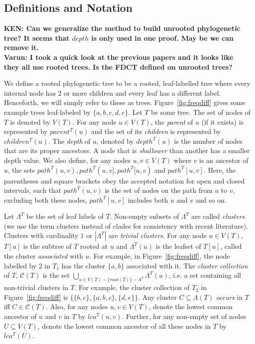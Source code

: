 \documentclass[final,1p,times]{elsarticle}
\newcommand{\leafset}{\Lambda}
\begin{document}
    \subsection{Definitions and Notation}
    \label{subsec:def}

    {\bf KEN: Can we generalize the method to build unrooted phylogenetic tree? It seems that $depth$ is only used in one proof. May be we can remove it.}\\
	{\bf Varun: I took a quick look at the previous papers and it looks like they all use rooted trees. Is the FDCT defined on unrooted trees?}

    We define a rooted phylogenetic tree to be a rooted, leaf-labelled tree where every internal node has 2 or more children and every leaf has a different label.  Henceforth, we will simply refer to these as trees.  Figure~\ref{fig:freqdiff} gives some example trees leaf-labeled by $\{a, b, c, d, e\}$.  Let $T$ be some tree. The set of nodes of $T$ is denoted by $V(T)$. For any node $u \in V(T)$, the \textit{parent} of $u$ (if it exists) is represented by $parent^T(u)$ and the set of its \textit{children} is represented by $children^T(u)$. The \textit{depth} of $u$, denoted by $depth^T(u)$ is the number of nodes that are its proper ancestors. A node that is \textit{shallower} than another has a smaller depth value. We also define, for any nodes $u, v \in V(T)$ where $v$ is an ancestor of $u$, the sets $path^T(u, v), path^T(u, v], path^T[u, v)$ and $path^T[u, v]$. Here, the parentheses and square brackets obey the accepted notation for open and closed intervals, such that $path^T(u, v)$ is the set of nodes on the path from $u$ to $v$, excluding both these nodes, $path^T[u, v]$ includes both $u$ and $v$ and so on.

    Let $\leafset^T$ be the set of leaf labels of $T$. Non-empty subsets of $\leafset^T$ are called \textit{clusters} (we use the term clusters instead of clades for consistency with recent literature). Clusters with cardinality $1$ or $|\leafset^T|$ are \textit{trivial clusters}. For any node $u \in V(T)$, $T[u]$ is the subtree of $T$ rooted at $u$ and $\leafset^T(u)$ is the leafset of $T[u]$, called the cluster \textit{associated} with $u$. For example, in Figure~\ref{fig:freqdiff}, the node labelled by $2$ in $T_1$ has the cluster $\{a, b\}$ associated with it. The \textit{cluster collection} of $T$, $\mathcal{C}(T)$ is the set $\bigcup_{u \in V(T) - \{root(T)\} - \leafset^T} {\leafset^T(u)}$, i.e. a set containing all non-trivial clusters in $T$. For example, the cluster collection of $T_2$ in Figure~\ref{fig:freqdiff} is $\{\{b, c\}, \{a, b, c\}, \{d, e\}\}$. Any cluster $C \subseteq \leafset(T)$ \textit{occurs} in $T$ iff $C \in \mathcal{C}(T)$. Also, for any nodes $u, v \in V(T)$, denote the lowest common ancestor of $u$ and $v$ in $T$ by $lca^T(u, v)$. Further, for any non-empty set of nodes $U \subseteq V(T)$, denote the lowest common ancestor of all these nodes in $T$ by $lca^T(U)$.
\end{document}
